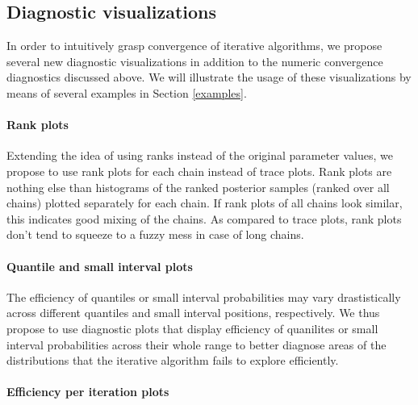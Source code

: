 \documentclass[american,]{article}
\let\oldparagraph\paragraph
\renewcommand{\paragraph}[1]{\oldparagraph{#1}\mbox{}}
\begin{document}
\hypertarget{diagnostic-visualizations}{%
\subsection{Diagnostic visualizations}\label{diagnostic-visualizations}}

In order to intuitively grasp convergence of iterative algorithms, we
propose several new diagnostic visualizations in addition to the numeric
convergence diagnostics discussed above. We will illustrate the usage of
these visualizations by means of several examples in Section
\ref{examples}.

\hypertarget{rank-plots}{%
\paragraph{Rank plots}\label{rank-plots}}

Extending the idea of using ranks instead of the original parameter
values, we propose to use rank plots for each chain instead
of trace plots. Rank plots are nothing else than histograms of the
ranked posterior samples (ranked over all chains) plotted separately for
each chain. If rank plots of all chains look similar, this indicates
good mixing of the chains. As compared to trace plots, rank plots don't
tend to squeeze to a fuzzy mess in case of long chains.

\hypertarget{quantile-and-small-interval-plots}{%
\paragraph{Quantile and small interval
plots}\label{quantile-and-small-interval-plots}}

The efficiency of quantiles or small interval probabilities may vary
drastistically across different quantiles and small interval positions,
respectively. We thus propose to use diagnostic plots that display
efficiency of quanilites or small interval probabilities across their
whole range to better diagnose areas of the distributions that the
iterative algorithm fails to explore efficiently.

\hypertarget{efficiency-change-plots}{%
\paragraph{Efficiency per iteration plots}\label{efficiency-change-plots}}
\end{document}
